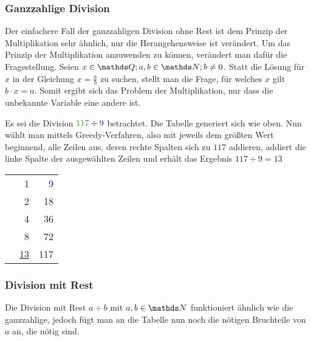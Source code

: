 	\subsubsection{Ganzzahlige Division}
	Der einfachere Fall der ganzzahligen Division ohne Rest ist dem Prinzip der Multiplikation sehr ähnlich, nur die Herangehensweise ist verändert. Um das Prinzip der Multiplikation anzuwenden zu können, verändert man dafür die Fragestellung. 
	Seien $x \in \Q; a,b\in \N; b \neq 0$. Statt die Lösung für $x$ in der Gleichung $x=\frac{a}{b}$ zu suchen, stellt man die Frage, für welches $x$ gilt $b \cdot x = a$. Somit ergibt sich das Problem der Multiplikation, nur dass die unbekannte Variable eine andere ist.
	
	\begin{bsp}
		Es sei die Division $\textcolor{OliveGreen}{117} \div \textcolor{blue}{9}$ betrachtet. Die Tabelle generiert sich wie oben. Nun wählt man mittels Greedy-Verfahren, also mit jeweils dem größten Wert beginnend, alle Zeilen aus, deren rechte Spalten sich zu $117$ addieren, addiert die linke Spalte der ausgewählten Zeilen und erhält das Ergebnis $117 \div 9 = 13$
		\begin{center}
			\begin{tabular}{r r r}
				\checkmark & 1 & \textcolor{blue}{9}\\
				& 2 & 18\\
				\checkmark & 4 & 36\\
				\checkmark & 8 & 72\\ \hline
				& \underline{\underline{13}} & \textcolor{OliveGreen}{117}
			\end{tabular}
		\end{center}
	\end{bsp}

	\subsubsection{Division mit Rest}
	Die Division mit Rest $a \div b$ mit $a, b \in \N$ funktioniert ähnlich wie die ganzzahlige, jedoch fügt man an die Tabelle nun noch die nötigen Bruchteile von $a$ an, die nötig sind.
	
